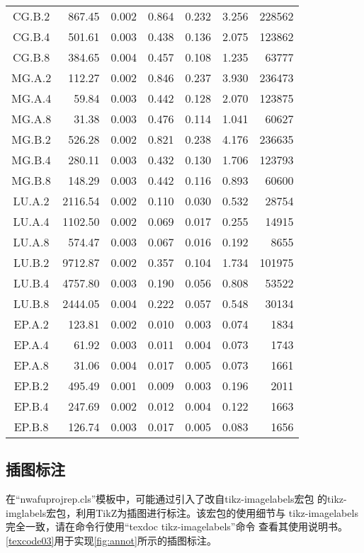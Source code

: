 \documentclass[
  ]{nwafuprojrep}
\begin{document}
\begin{longtable}[c]{c*{6}{r}}
        CG.B.2 & 867.45 & 0.002 & 0.864 & 0.232 & 3.256 & 228562 \\
        CG.B.4 & 501.61 & 0.003 & 0.438 & 0.136 & 2.075 & 123862 \\
        CG.B.8 & 384.65 & 0.004 & 0.457 & 0.108 & 1.235 & 63777 \\
        MG.A.2 & 112.27 & 0.002 & 0.846 & 0.237 & 3.930 & 236473 \\
        MG.A.4 & 59.84 & 0.003 & 0.442 & 0.128 & 2.070 & 123875 \\
        MG.A.8 & 31.38 & 0.003 & 0.476 & 0.114 & 1.041 & 60627 \\
        MG.B.2 & 526.28 & 0.002 & 0.821 & 0.238 & 4.176 & 236635 \\
        MG.B.4 & 280.11 & 0.003 & 0.432 & 0.130 & 1.706 & 123793 \\
        MG.B.8 & 148.29 & 0.003 & 0.442 & 0.116 & 0.893 & 60600 \\
        LU.A.2 & 2116.54 & 0.002 & 0.110 & 0.030 & 0.532 & 28754 \\
        LU.A.4 & 1102.50 & 0.002 & 0.069 & 0.017 & 0.255 & 14915 \\
        LU.A.8 & 574.47 & 0.003 & 0.067 & 0.016 & 0.192 & 8655 \\
        LU.B.2 & 9712.87 & 0.002 & 0.357 & 0.104 & 1.734 & 101975 \\
        LU.B.4 & 4757.80 & 0.003 & 0.190 & 0.056 & 0.808 & 53522 \\
        LU.B.8 & 2444.05 & 0.004 & 0.222 & 0.057 & 0.548 & 30134 \\
        EP.A.2 & 123.81 & 0.002 & 0.010 & 0.003 & 0.074 & 1834 \\
        EP.A.4 & 61.92 & 0.003 & 0.011 & 0.004 & 0.073 & 1743 \\
        EP.A.8 & 31.06 & 0.004 & 0.017 & 0.005 & 0.073 & 1661 \\
        EP.B.2 & 495.49 & 0.001 & 0.009 & 0.003 & 0.196 & 2011 \\
        EP.B.4 & 247.69 & 0.002 & 0.012 & 0.004 & 0.122 & 1663 \\
        EP.B.8 & 126.74 & 0.003 & 0.017 & 0.005 & 0.083 & 1656 \\
        \bottomrule
   \end{longtable}

\subsection{插图标注}
在\enquote{nwafuprojrep.cls}模板中，可能通过引入了改自tikz-imagelabels宏包
的tikz-imglabels宏包，利用TikZ为插图进行标注。该宏包的使用细节与
tikz-imagelabels完全一致，请在命令行使用\enquote{texdoc tikz-imagelabels}命令
查看其使用说明书。\autoref{texcode03}用于实现\autoref{fig:annot}所示的插图标注。
\end{document}
